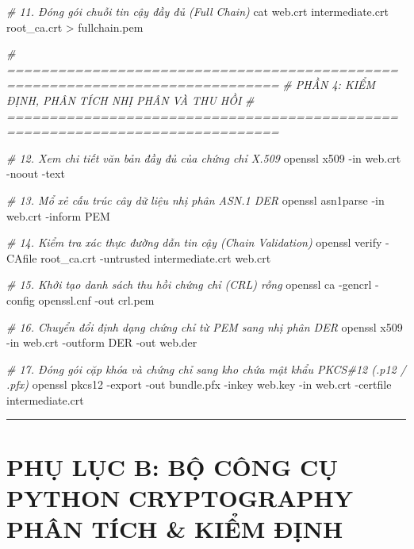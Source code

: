 \documentclass[
]{article}
\newenvironment{Shaded}{}{}
\newcommand{\AttributeTok}[1]{\textcolor[rgb]{0.49,0.56,0.16}{#1}}
\newcommand{\CommentTok}[1]{\textcolor[rgb]{0.38,0.63,0.69}{\textit{#1}}}
\newcommand{\ExtensionTok}[1]{#1}
\newcommand{\FunctionTok}[1]{\textcolor[rgb]{0.02,0.16,0.49}{#1}}
\newcommand{\NormalTok}[1]{#1}
\newcommand{\OperatorTok}[1]{\textcolor[rgb]{0.40,0.40,0.40}{#1}}
\begin{document}
\begin{Shaded}
\begin{Highlighting}[]
\CommentTok{\# 11. Đóng gói chuỗi tin cậy đầy đủ (Full Chain)}
\FunctionTok{cat}\NormalTok{ web.crt intermediate.crt root\_ca.crt }\OperatorTok{\textgreater{}}\NormalTok{ fullchain.pem}

\CommentTok{\# ==============================================================================}
\CommentTok{\# PHẦN 4: KIỂM ĐỊNH, PHÂN TÍCH NHỊ PHÂN VÀ THU HỒI}
\CommentTok{\# ==============================================================================}

\CommentTok{\# 12. Xem chi tiết văn bản đầy đủ của chứng chỉ X.509}
\ExtensionTok{openssl}\NormalTok{ x509 }\AttributeTok{{-}in}\NormalTok{ web.crt }\AttributeTok{{-}noout} \AttributeTok{{-}text}

\CommentTok{\# 13. Mổ xẻ cấu trúc cây dữ liệu nhị phân ASN.1 DER}
\ExtensionTok{openssl}\NormalTok{ asn1parse }\AttributeTok{{-}in}\NormalTok{ web.crt }\AttributeTok{{-}inform}\NormalTok{ PEM}

\CommentTok{\# 14. Kiểm tra xác thực đường dẫn tin cậy (Chain Validation)}
\ExtensionTok{openssl}\NormalTok{ verify }\AttributeTok{{-}CAfile}\NormalTok{ root\_ca.crt }\AttributeTok{{-}untrusted}\NormalTok{ intermediate.crt web.crt}

\CommentTok{\# 15. Khởi tạo danh sách thu hồi chứng chỉ (CRL) rỗng}
\ExtensionTok{openssl}\NormalTok{ ca }\AttributeTok{{-}gencrl} \AttributeTok{{-}config}\NormalTok{ openssl.cnf }\AttributeTok{{-}out}\NormalTok{ crl.pem}

\CommentTok{\# 16. Chuyển đổi định dạng chứng chỉ từ PEM sang nhị phân DER}
\ExtensionTok{openssl}\NormalTok{ x509 }\AttributeTok{{-}in}\NormalTok{ web.crt }\AttributeTok{{-}outform}\NormalTok{ DER }\AttributeTok{{-}out}\NormalTok{ web.der}

\CommentTok{\# 17. Đóng gói cặp khóa và chứng chỉ sang kho chứa mật khẩu PKCS\#12 (.p12 / .pfx)}
\ExtensionTok{openssl}\NormalTok{ pkcs12 }\AttributeTok{{-}export} \AttributeTok{{-}out}\NormalTok{ bundle.pfx }\AttributeTok{{-}inkey}\NormalTok{ web.key }\AttributeTok{{-}in}\NormalTok{ web.crt }\AttributeTok{{-}certfile}\NormalTok{ intermediate.crt}
\end{Highlighting}
\end{Shaded}

\begin{center}\rule{0.5\linewidth}{0.5pt}\end{center}

\section{PHỤ LỤC B: BỘ CÔNG CỤ PYTHON CRYPTOGRAPHY PHÂN TÍCH \& KIỂM
ĐỊNH}\label{phux1ee5-lux1ee5c-b-bux1ed9-cuxf4ng-cux1ee5-python-cryptography-phuxe2n-tuxedch-kiux1ec3m-ux111ux1ecbnh}
\end{document}
